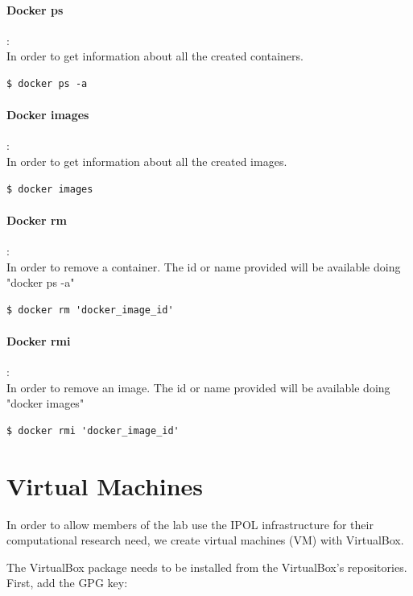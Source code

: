 \documentclass[a4paper,12pt]{article}
\begin{document}
\paragraph{Docker ps}:\\
In order to get information about all the created containers.
\begin{lstlisting}[firstnumber=1,breaklines]
  $ docker ps -a
\end{lstlisting}

\paragraph{Docker images}:\\
In order to get information about all the created images.
\begin{lstlisting}[firstnumber=1,breaklines]
  $ docker images
\end{lstlisting}

\paragraph{Docker rm}:\\
In order to remove a container. The id or name provided will be available doing "docker ps -a"
\begin{lstlisting}[firstnumber=1,breaklines]
  $ docker rm 'docker_image_id'
\end{lstlisting}

\paragraph{Docker rmi}:\\
In order to remove an image. The id or name provided will be available doing "docker images"
\begin{lstlisting}[firstnumber=1,breaklines]
  $ docker rmi 'docker_image_id'
\end{lstlisting}



\section{Virtual Machines}
In order to allow members of the lab use the IPOL infrastructure for their computational research need, we create virtual machines (VM) with VirtualBox.

The VirtualBox package needs to be installed from the VirtualBox's repositories. First, add the GPG key:
\end{document}
